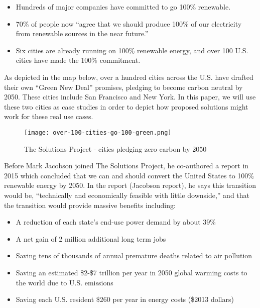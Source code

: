 \documentclass[hidelinks,12pt,a4paper]{article}
\begin{document}
{\footnotesize
\begin{itemize}
    \item Hundreds of major companies have committed to go 100\% renewable.
    \item 70\% of people now “agree that we should produce 100\% of our electricity from renewable sources in the near future.”
    \item Six cities are already running on 100\% renewable energy, and over 100 U.S. cities have made the 100\% commitment.
\end{itemize}
}

As depicted in the map below, over a hundred cities across the U.S. have drafted their own “Green New Deal” promises, pledging to become carbon neutral by 2050. These cities include San Francisco \cite{SFNetZeroBy2050} and New York. \cite{ActionOnGlobalWarmingNYCsGreenNewDeal} In this paper, we will use these two cities as case studies in order to depict how proposed solutions might work for these real use cases.

\begin{figure}[ht!]
    \centering
    \texttt{[image: over-100-cities-go-100-green.png]}
    \caption{The Solutions Project - cities pledging zero carbon by 2050 \cite{TheSolutionsProject2018ImpactReport}}
\end{figure}
\FloatBarrier


Before Mark Jacobson joined The Solutions Project, he co-authored a report in 2015 which concluded that we can and should convert the United States to 100\% renewable energy by 2050. In the report (Jacobson report), he says this transition would be, “technically and economically feasible with little downside,” \cite{100PercCleanAndRenewableEnergyBy2050} and that the transition would provide massive benefits including: \cite{100PercCleanAndRenewableEnergyBy2050}

{\footnotesize
\begin{itemize}
    \item A reduction of each state’s end-use power demand by about 39\%
    \item A net gain of 2 million additional long term jobs
    \item Saving tens of thousands of annual premature deaths related to air pollution
    \item Saving an estimated \$2-\$7 trillion per year in 2050 global warming costs to the world due to U.S. emissions
    \item Saving each U.S. resident \$260 per year in energy costs (\$2013 dollars)
\end{itemize}
}
\end{document}
